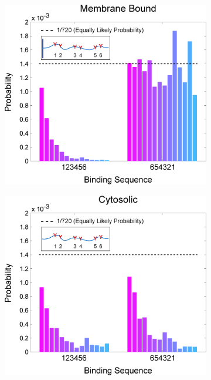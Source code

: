\documentclass[../../AdvancementSummary.tex]{subfiles}
\begin{document}
\begin{figure}[H]
	\begin{center}
		\begin{subfigure}{0.3\linewidth}
			\includegraphics[width=\linewidth]{ResultsFigures/MultipleSequentialBinding/MemOn/ProbVSSequence.eps}
			\caption{}
		\end{subfigure}
		\begin{subfigure}{0.3\linewidth}
			\includegraphics[width=\linewidth]{ResultsFigures/MultipleSequentialBinding/MemOff/ProbVSSequence.eps}

\end{subfigure}
\end{center}
\end{figure}
\end{document}

